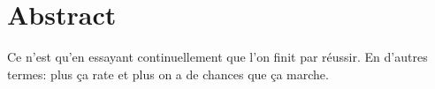\documentclass[10pt, letterpaper]{book}
\begin{document}
    

    \frontmatter
    \chapter*{\centering Abstract}
        Ce n'est qu'en essayant continuellement que l'on finit par réussir.
        En d'autres termes: plus ça rate et plus on a de chances que ça marche.
    \setcounter{tocdepth}{2}
    \tableofcontents

    \listoffigures

    \listoftables

    \setlength{\parskip}{5pt}

    

    \mainmatter
    

    

    

    \appendix
    

    
    
\end{document}
